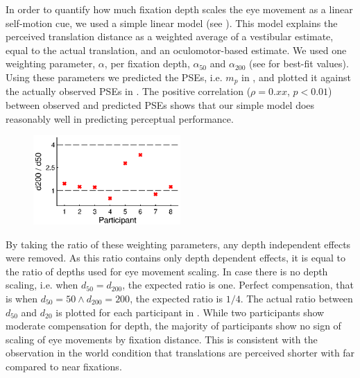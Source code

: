 In order to quantify how much fixation depth scales the eye movement as a linear self-motion cue, we used a simple linear model (see ). This model explains the perceived translation distance as a weighted average of a vestibular estimate, equal to the actual translation, and an oculomotor-based estimate. 
We used one weighting parameter, $\alpha$, per fixation depth, $\alpha_{50}$ and $\alpha_{200}$ (see  for best-fit values). Using these parameters we predicted the PSEs, i.e. $m_p$ in , and plotted it against the actually  observed PSEs in . The positive correlation ($\rho = 0.xx$, $p < 0.01$) between observed and predicted PSEs shows that our simple model does reasonably well in predicting perceptual performance.

\begin{figure}
    \includegraphics[width=0.5\textwidth]{src/paper4/paper4_figure5.eps}

	\caption{}
	\label{p4:fig5}
\end{figure}

By taking the ratio of these weighting parameters, any depth independent effects were removed. As this ratio contains only depth dependent effects, it is equal to the ratio of depths used for eye movement scaling. In case there is no depth scaling, i.e. when $d_{50} = d_{200}$, the expected ratio is one. Perfect compensation, that is when $d_{50} = 50  \wedge d_{200} = 200$, the expected ratio is $1/4$. The actual ratio between $d_{50}$ and $d_{20}$ is plotted for each participant in . While two participants show moderate compensation for depth, the majority of participants show no sign of scaling of eye movements by fixation distance. This is consistent with the observation in the world condition that translations are perceived shorter with far compared to near fixations.
